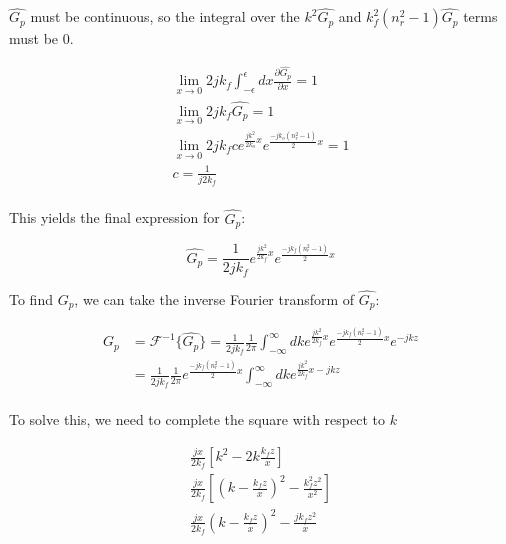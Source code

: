 \noindent $\hat{G_p}$ must be continuous, so the integral over the $k^2\hat{G_p}$ and $k_f^2(n_r^2-1)\hat{G_p}$ terms must be 0.

\begin{equation}
\begin{gathered}
\lim_{x\rightarrow 0}2jk_f\int_{-\epsilon}^{\epsilon}dx\frac{\partial\hat{G_p}}{\partial x}= 1\\
\lim_{x\rightarrow 0}2jk_f\hat{G_p} = 1 \\
\lim_{x\rightarrow 0}2jk_fce^{\frac{jk^2}{2k_o}x}e^{\frac{-jk_o(n_r^2-1)}{2}x} = 1\\
c = \frac{1}{j2k_f}\\
\end{gathered}
\label{gf_eq:11cb}
\end{equation}
 \renewcommand{\baselinestretch}{2} \small\normalsize
 
\noindent This yields the final expression for $\hat{G_p}$:

\begin{equation}
\hat{G_p}= \frac{1}{2jk_f}e^{\frac{jk^2}{2k_f}x}e^{\frac{-jk_f(n_r^2-1)}{2}x}
\label{gf_eq:11cc}
\end{equation}
 \renewcommand{\baselinestretch}{2} \small\normalsize
 
\noindent To find $G_p$, we can take the inverse Fourier transform of $\hat{G_p}$:

\begin{equation}
\begin{aligned}
G_p &= \mathcal{F}^{-1}\{\hat{G_p}\} = \frac{1}{2jk_f}\frac{1}{2\pi}\int_{-\infty}^{\infty}dk e^{\frac{jk^2}{2k_f}x}e^{\frac{-jk_f(n_r^2-1)}{2}x}e^{-jkz} \\
& = \frac{1}{2jk_f}\frac{1}{2\pi}e^{\frac{-jk_f(n_r^2-1)}{2}x}\int_{-\infty}^{\infty}dk e^{\frac{jk^2}{2k_f}x-jkz} \\
\end{aligned}
\label{gf_eq:11d}
\end{equation}
 \renewcommand{\baselinestretch}{2} \small\normalsize
 
\noindent To solve this, we need to complete the square with respect to $k$

\begin{equation}
\begin{gathered}
\frac{jx}{2k_f}\left[k^2  -2k\frac{k_fz}{x}\right]\\
\frac{jx}{2k_f}\left[\left(k - \frac{k_fz}{x}\right)^2 - \frac{k_f^2z^2}{x^2} \right]\\
\frac{jx}{2k_f}\left(k - \frac{k_fz}{x}\right)^2 - \frac{jk_fz^2}{x}\\
\end{gathered}
\label{gf_eq:11e}
\end{equation}
 \renewcommand{\baselinestretch}{2} \small\normalsize
 
